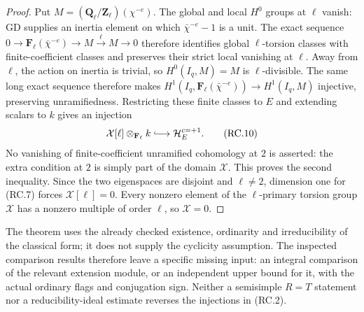 \begin{proof}
Put $M=(\mathbf Q_\ell/\mathbf Z_\ell)(\chi^{-e})$.
The global and local $H^0$ groups at $\ell$ vanish:
GD supplies an inertia element on which
$\bar\chi^{-e}-1$ is a unit.  The exact sequence
$0\to\mathbf F_\ell(\bar\chi^{-e})\to M
\xrightarrow{\ell}M\to0$ therefore identifies
global $\ell$-torsion classes with finite-coefficient
classes and preserves their strict local vanishing
at $\ell$.  Away from $\ell$, the action on inertia
is trivial, so $H^0(I_q,M)=M$ is $\ell$-divisible.
The same long exact sequence therefore makes
$H^1(I_q,\mathbf F_\ell(\bar\chi^{-e}))\to H^1(I_q,M)$
injective, preserving unramifiedness.  Restricting these finite classes to
$E$ and extending scalars to $k$ gives an injection
\[
 \mathcal X[\ell]\otimes_{\mathbf F_\ell}k
                  \lhook\joinrel\longrightarrow
                         \mathcal H_E^{c=+1}.              \tag{RC.10}
\]
No vanishing of finite-coefficient unramified cohomology
at $2$ is asserted: the extra condition at $2$ is
simply part of the domain $\mathcal X$.
This proves the second inequality.  Since the two
eigenspaces are disjoint and $\ell\ne2$, dimension
one for (RC.7) forces $\mathcal X[\ell]=0$.
Every nonzero element of the $\ell$-primary torsion
group $\mathcal X$ has a nonzero multiple of order
$\ell$, so $\mathcal X=0$.
\end{proof}

The theorem uses the already checked existence,
ordinarity and irreducibility of the classical form;
it does not supply the cyclicity assumption.
The inspected comparison results therefore leave a
specific missing input: an integral comparison of
the relevant extension module, or an independent
upper bound for it, with the actual ordinary flags
and conjugation sign.  Neither a semisimple $R=T$
statement nor a reducibility-ideal estimate reverses
the injections in (RC.2).
